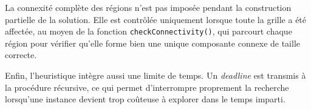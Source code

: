 La connexité complète des régions n'est pas imposée pendant la construction partielle de la solution. Elle est contrôlée uniquement lorsque toute la grille a été affectée, au moyen de la fonction \texttt{checkConnectivity()}, qui parcourt chaque région pour vérifier qu'elle forme bien une unique composante connexe de taille correcte.

Enfin, l'heuristique intègre aussi une limite de temps. Un \textit{deadline} est transmis à la procédure récursive, ce qui permet d'interrompre proprement la recherche lorsqu'une instance devient trop coûteuse à explorer dans le temps imparti.

